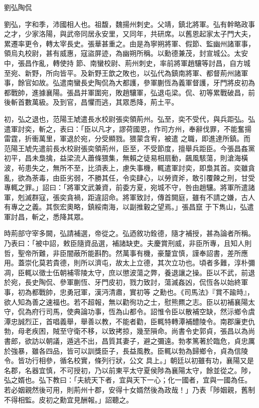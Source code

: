 
\begin{pinyinscope}

 劉弘陶侃



 劉弘，字和季，沛國相人也。祖馥，魏揚州刺史。父靖，鎮北將軍。弘有幹略政事之才，少家洛陽，與武帝同居永安里，又同年，共研席。以舊恩起家太子門大夫，累遷率更令，轉太宰長史。張華甚重之。由是為寧朔將軍、假節、監幽州諸軍事，領烏丸校尉，甚有威惠，寇盜屏迹，為幽朔所稱。以勳德兼茂，封宣城公。太安中，張昌作亂，轉使持
 節、南蠻校尉、荊州刺史，率前將軍趙驤等討昌，自方城至宛、新野，所向皆平。及新野王歆之敗也，以弘代為鎮南將軍、都督荊州諸軍事，餘官如故。弘遣南蠻長史陶侃為大都護，參軍蒯恆為義軍督護，牙門將皮初為都戰帥，進據襄陽。張昌并軍圍宛，敗趙驤軍，弘退屯梁。侃、初等累戰破昌，前後斬首數萬級。及到官，昌懼而逃，其眾悉降，荊土平。



 初，弘之退也，范陽王虓遣長水校尉張奕領荊州。弘至，奕不受代，與兵距弘。弘遣軍討奕，斬之，表曰：「臣以凡才，謬荷國恩，作司方州，奉辭伐罪，不能奮揚雷霆，折衝萬里，軍退於宛，分受顯戮。猥蒙含宥，被遣
 之職，即進達所鎮。而范陽王虓先遣前長水校尉張奕領荊州，臣至，不受節度，擅舉兵距臣。今張昌姦黨初平，昌未梟擒，益梁流人蕭條猥集，無賴之徒易相扇動，飆風駭蕩，則滄海橫波，茍患失之，無所不至，比須表上，慮失事機，輒遣軍討奕，即梟其首。奕雖貪亂，欲為荼毒，由臣劣弱，不勝其任，令奕肆心，以勞資斧，敢引覆餗之刑，甘受專輒之罪。」詔曰：「將軍文武兼資，前委方夏，宛城不守，咎由趙驤。將軍所遣諸軍，剋滅群寇，張奕貪禍，距違詔命。將軍致討，傳首闕庭，雖有不請之嫌，古人有專之之義。其恢宏奧略，鎮綏南海，以副推轂之望焉。」張昌竄
 于下雋山，弘遣軍討昌，斬之，悉降其眾。



 時荊部守宰多闕，弘請補選，帝從之。弘迺敘功銓德，隨才補授，甚為論者所稱。乃表曰：「被中詔，敕臣隨資品選，補諸缺吏。夫慶賞刑威，非臣所專，且知人則哲，聖帝所難，非臣闇蔽所能斟酌。然萬事有機，豪釐宜慎，謹奉詔書，差所應用。蓋崇化莫若貴德，則所以濟屯，故太上立德，其次立功也。頃者多難，淳朴彌凋，臣輒以徵士伍朝補零陵太守，庶以懲波蕩之弊，養退讓之操。臣以不武，前退於宛，長史陶侃、參軍蒯恆、牙門皮初，戮力致討，蕩滅姦凶，侃恆各以始終軍事，初為都戰帥，忠勇冠軍，漢沔清肅，實初等
 之勳也。《司馬法》『賞不踰時』，欲人知為善之速福也。若不超報，無以勸徇功之士，慰熊羆之志。臣以初補襄陽太守，侃為府行司馬，使典論功事，恆為山都令。詔惟令臣以散補空缺，然沶鄉令虞潭忠誠烈正，首唱義舉，舉善以教，不能者勸，臣輒特轉潭補醴陵令。南郡廉吏仇勃，母老疾困，賊至守衛不移，以致拷掠，幾至隕命。尚書令史郭貞，張昌以為尚書郎，欲訪以朝議，遁逃不出，昌質其妻子，避之彌遠。勃孝篤著於臨危，貞忠厲於強暴，雖各四品，皆可以訓獎臣子，長益風教。臣輒以勃為歸鄉令，貞為信陵令。皆功行相參，循名校實，條列行狀，公文
 具上。」朝廷以初雖有功，襄陽又是名郡，名器宜慎，不可授初，乃以前東平太守夏侯陟為襄陽太守，餘並從之。陟，弘之婿也。弘下教曰：「夫統天下者，宜與天下一心；化一國者，宜與一國為任。若必姻親然後可用，則荊州十郡，安得十女婿然後為政哉！」乃表「陟姻親，舊制不得相監。皮初之勳宜見酬報。」詔聽之。




\end{pinyinscope}
